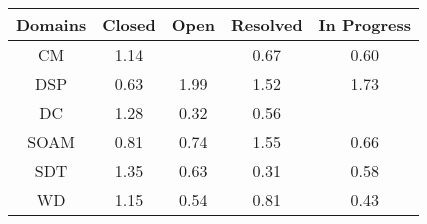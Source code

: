 \begin{tabular}{|c||c|c|c|c|}
\hline
Domains & Closed & Open & Resolved & In Progress \\ 
\hline
CM & \cellcolor[rgb]{0.8562873422592087,0.814557162122783,0.42} 1.14 &  & \cellcolor[rgb]{0.8386634134782747,0.5023401571304996,0.35341918591305627} 0.67 & \cellcolor[rgb]{0.8227116201175868,0.4268350018899111,0.3385308454430811} 0.60 \\ 
\hline
DSP & \cellcolor[rgb]{0.8298721957837194,0.4607283933762716,0.34521404939813805} 0.63 & \cellcolor[rgb]{0.53,0.66,0.42} 1.99 & \cellcolor[rgb]{0.7085346477223133,0.7445690436579379,0.42} 1.52 & \cellcolor[rgb]{0.6274460381289386,0.7061586496400235,0.42} 1.73 \\ 
\hline
DC & \cellcolor[rgb]{0.8006195653964716,0.7881882151878024,0.42} 1.28 & \cellcolor[rgb]{0.7606993154378308,0.133310093072399,0.2806526944086421} 0.32 & \cellcolor[rgb]{0.8143065731356731,0.38705111284218596,0.33068613492662824} 0.56 &  \\ 
\hline
SOAM & \cellcolor[rgb]{0.8675768708149711,0.6391971885241969,0.3804050794273064} 0.81 & \cellcolor[rgb]{0.8542364271415335,0.5760524218032583,0.3679539986654312} 0.74 & \cellcolor[rgb]{0.6978363337158339,0.739501421233816,0.42} 1.55 & \cellcolor[rgb]{0.8366667073390204,0.492889081404696,0.35155559351641896} 0.66 \\ 
\hline
SDT & \cellcolor[rgb]{0.7760154463021534,0.7765336324589147,0.41999999999999993} 1.35 & \cellcolor[rgb]{0.8287726283445483,0.4555237741641954,0.34418778645491177} 0.63 & \cellcolor[rgb]{0.76,0.13,0.28} 0.31 & \cellcolor[rgb]{0.8189694814617892,0.40912221225246825,0.33503818269766983} 0.58 \\ 
\hline
WD & \cellcolor[rgb]{0.8528948579896191,0.8129501958898195,0.42000000000000004} 1.15 & \cellcolor[rgb]{0.8104969276555833,0.3690187909030944,0.32713046581187777} 0.54 & \cellcolor[rgb]{0.8694307516051225,0.6479722242642465,0.382135368164781} 0.81 & \cellcolor[rgb]{0.784922652307158,0.24796722092054718,0.3032611421533473} 0.43 \\ 
\hline
\end{tabular}